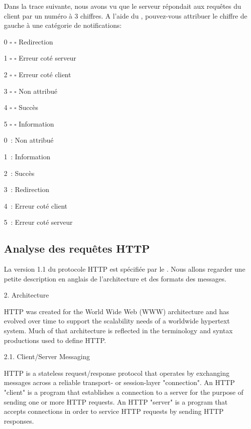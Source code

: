 {Dans la trace suivante, nous avons vu que le serveur répondait aux requêtes du client par un numéro à 3 chiffres. A l'aide du , pouvez-vous attribuer le chiffre de gauche à une catégorie de notifications:
  \vspace{1em}

\tabto{3cm}
\begin{description}
    \item    0 $\square$ \tab\tab $\square$ Redirection 
    \item    1 $\square$ \tab\tab $\square$ Erreur coté serveur
    \item    2 $\square$ \tab\tab $\square$ Erreur coté client
    \item    3 $\square$ \tab\tab $\square$ Non attribué 
    \item    4 $\square$ \tab\tab $\square$ Succès
    \item    5 $\square$ \tab\tab $\square$ Information 
\end{description}

}
{
\begin{description}
    \item    0~:  Non attribué 
    \item    1~: Information 
    \item    2~: Succès
    \item    3~: Redirection
    \item    4~: Erreur coté client
    \item    5~: Erreur coté serveur
\end{description}}

\subsection{Analyse des requêtes HTTP}

La version 1.1 du protocole \ac{HTTP}  est spécifiée par le . Nous allons regarder une petite description en anglais de l'architecture et des formats des messages.

\begin{termc} [basicstyle=\footnotesize\ttfamily, frame=single]

2.  Architecture

  HTTP was created for the World Wide Web (WWW) architecture and has
  evolved over time to support the scalability needs of a worldwide
  hypertext system.  Much of that architecture is reflected in the
  terminology and syntax productions used to define HTTP.

2.1.  Client/Server Messaging

  HTTP is a stateless request/response protocol that operates by
  exchanging messages  across a reliable transport- or
  session-layer "connection".  An HTTP "client" is a
  program that establishes a connection to a server for the purpose of
  sending one or more HTTP requests.  An HTTP "server" is a program
  that accepts connections in order to service HTTP requests by sending
  HTTP responses.

\end{termc}

